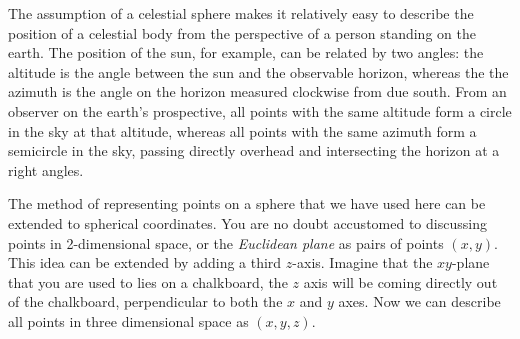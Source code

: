 

The assumption of a celestial sphere makes it relatively easy to describe the position of a celestial body from the perspective of a person standing on the earth. The position of the sun, for example, can be related by two angles: the altitude is the angle between the sun and the observable horizon, whereas the the azimuth is the angle on the horizon measured clockwise from due south. From an observer on the earth's prospective, all points with the same altitude form a circle in the sky at that altitude, whereas all points with the same azimuth form a semicircle in the sky, passing directly overhead and intersecting the horizon at a right angles.




The method of representing points on a sphere that we have used here can be extended to spherical coordinates. You are no doubt accustomed to discussing points in 2-dimensional space, or the \emph{Euclidean plane} as pairs of points $(x,y)$. This idea can be extended by adding a third $z$-axis. Imagine that the $xy$-plane that you are used to lies on a chalkboard, the $z$ axis will be coming directly out of the chalkboard, perpendicular to both the $x$ and $y$ axes. Now we can describe all points in three dimensional space as $(x,y,z)$.


